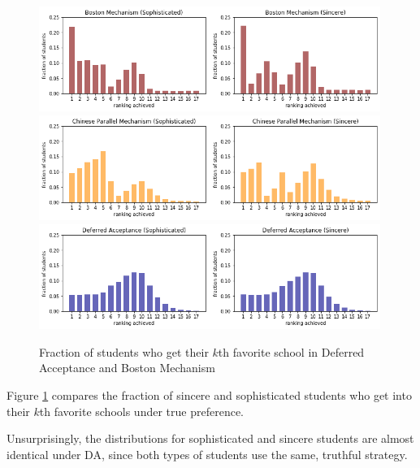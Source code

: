 \documentclass[10pt, reqno]{amsart}
\begin{document}
\begin{figure}[h]
  \centering
  \includegraphics[width=0.99\textwidth]{../figures/BM_frac_choice_p2.png}\\
  \includegraphics[width=0.99\textwidth]{../figures/CP_frac_choice_p2.png}\\
  \includegraphics[width=0.99\textwidth]{../figures/DA_frac_choice_p2.png}
  \caption{Fraction of students who get their $k$th favorite school in Deferred Acceptance and Boston Mechanism}
  \label{fig:figure1}
\end{figure}

Figure \ref{fig:figure1} compares the fraction of sincere and sophisticated students who get into their $k$th favorite schools under true preference. 

Unsurprisingly, the distributions for sophisticated and sincere students are almost identical under DA, since both types of students use the same, truthful strategy. 
\end{document}
